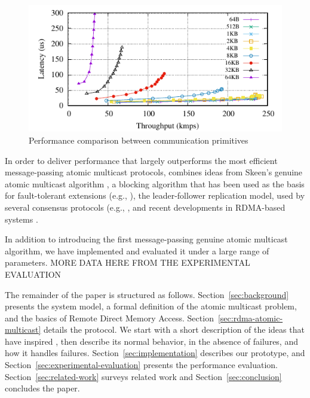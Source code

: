 \begin{figure}[htp!]
    \centering
    \includegraphics[width=0.99\columnwidth]{figures/benchmark/graphs/figure-performance-vs-size-single-group}
  \caption{Performance comparison between communication primitives}
  \label{fig:perfcomp}
\end{figure}

In order to deliver performance that largely outperforms the most efficient message-passing atomic multicast protocols, \libname combines ideas from Skeen's genuine atomic multicast algorithm \cite{BJ87b}, a blocking algorithm that has been used as the basis for fault-tolerant extensions (e.g., \cite{Coelho2017,gotsman2019white}), the leader-follower replication model, used by several consensus protocols (e.g., \cite{gotsman2019white,Junqueira2011,Mu}, and recent developments in RDMA-based systems \cite{Aguilera2019,kalia2014using, kalia2016design, mitchell2013using}.

In addition to introducing the first message-passing genuine atomic multicast algorithm, we have implemented and evaluated it under a large range of parameters. 
MORE DATA HERE FROM THE EXPERIMENTAL EVALUATION

The remainder of the paper is structured as follows.
Section~\ref{sec:background} presents the system model, a formal definition of the atomic multicast problem, and the basics of Remote Direct Memory Access.
Section~\ref{sec:rdma-atomic-multicast} details the \libname protocol.
We start with a short description of the ideas that have inspired \libname, then describe its normal behavior, in the absence of failures, and how it handles failures.
Section~\ref{sec:implementation} describes our prototype, and Section~\ref{sec:experimental-evaluation} presents the performance evaluation.
Section~\ref{sec:related-work} surveys related work and Section~\ref{sec:conclusion} concludes the paper.

